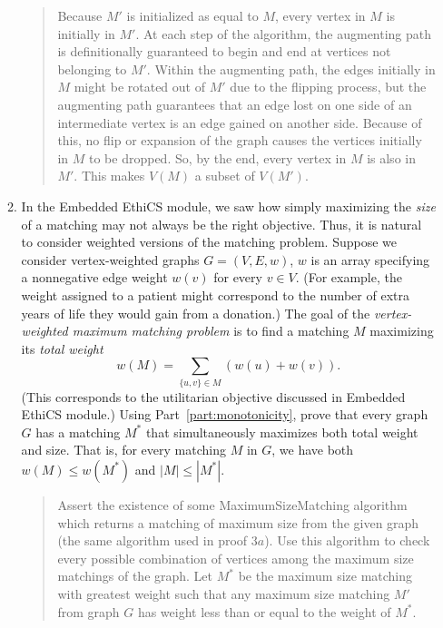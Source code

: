 \documentclass[11pt]{article}
\begin{document}
\begin{enumerate}
\begin{enumerate}
\begin{quote}
            Because $M'$ is initialized as equal to $M$, every vertex in $M$ is initially in $M'$. At each step of the algorithm, the augmenting path is definitionally guaranteed to begin and end at vertices not belonging to $M'$. Within the augmenting path, the edges initially in $M$ might be rotated out of $M'$ due to the flipping process, but the augmenting path guarantees that an edge lost on one side of an intermediate vertex is an edge gained on another side. Because of this, no flip or expansion of the graph causes the vertices initially in $M$ to be dropped. So, by the end, every vertex in $M$ is also in $M'$. This makes $V(M)$ a subset of $V(M')$.
        \end{quote}

        \item   In the Embedded EthiCS module, we saw how simply maximizing the {\em size} of a matching may not always be the right objective.  Thus, it is natural to consider weighted versions of the matching problem. Suppose 
        we consider vertex-weighted graphs $G = (V,E,w)$, $w$ is an array specifying a nonnegative edge weight $w(v)$ for every $v\in V$.  (For example, the weight assigned to a patient might correspond to the number of extra years of life they would gain from a donation.)
          The goal of the {\em vertex-weighted maximum matching problem} is to find a matching $M$ maximizing its {\em total weight} $$w(M) = \sum_{\{u,v\}\in M} (w(u)+w(v)).$$
        (This corresponds to the utilitarian objective discussed in Embedded EthiCS module.)
        Using Part~\ref{part:monotonicity}, prove that every graph $G$ has a matching $M^*$ that simultaneously maximizes both total weight and size.  That is, for every matching $M$ in $G$, we have
        both $w(M)\leq w(M^*)$ and $|M|\leq |M^*|$.

        \begin{quote}
            \color{purple}
            Assert the existence of some MaximumSizeMatching algorithm which returns a matching of maximum size from the given graph (the same algorithm used in proof $3a$). Use this algorithm to check every possible combination of vertices among the maximum size matchings of the graph. Let $M^*$ be the maximum size matching with greatest weight such that any maximum size matching $M'$ from graph $G$ has weight less than or equal to the weight of $M^*$. \\


\end{quote}
\end{enumerate}
\end{enumerate}
\end{document}

